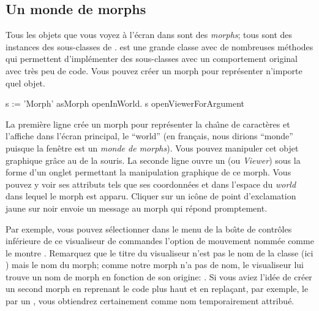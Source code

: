 \documentclass[a4paper,10pt,twoside]{book}
\begin{document}
\subsection{Un monde de morphs}
Tous les objets que vous voyez \`a l'\'ecran dans \sq sont des
\emph{morphs}; tous sont des instances des sous-classes de .
\mbox{} est une grande classe avec de nombreuses m\'ethodes
qui permettent d'impl\'ementer des sous-classes avec un comportement
original avec tr\`es peu de code.
Vous pouvez cr\'eer un morph pour repr\'esenter n'importe quel objet. 


\begin{code}{}
s := 'Morph' asMorph openInWorld.
s openViewerForArgument
\end{code}

La premi\`ere ligne cr\'ee un morph pour repr\'esenter la cha\^{\i}ne
de caract\`eres  et l'affiche dans
l'\'ecran principal, le ``world'' (en fran\c{c}ais, nous dirions
``monde'' puisque la fen\^etre \sq est un \emph{monde de morphs}).
Vous pouvez manipuler cet objet graphique gr\^ace au 
de la souris.
La seconde ligne ouvre un  (ou
\emph{Viewer}) sous la forme d'un onglet
permettant la manipulation graphique de ce morph. Vous pouvez y voir
ses attributs tels que ses coordonn\'ees  et  dans
l'espace du \emph{world} dans lequel le morph est apparu.
Cliquer sur un ic\^one de point d'exclamation jaune sur noir envoie un
message au morph qui r\'epond promptement.

Par exemple, vous pouvez s\'electionner dans le menu de la bo\^{\i}te de
contr\^oles inf\'erieure de ce visualiseur de commandes l'option de
mouvement nomm\'ee  comme le montre .
Remarquez que le titre du visualiseur n'est pas le nom de la classe
(ici \mbox{)} mais le nom du morph; comme notre morph n'a pas
de nom, le visualiseur lui trouve un nom de morph en fonction de son
origine: . Si vous aviez l'id\'ee de cr\'eer un second
morph en reprenant le code plus haut et en repla\c{c}ant, par exemple,
le  par un , vous obtiendrez certainement  comme nom
temporairement attribu\'e.
\end{document}
